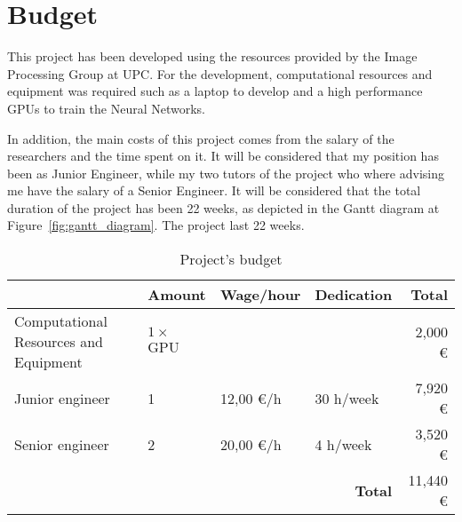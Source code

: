 \chapter{Budget}

This project has been developed using the resources provided by the Image Processing Group at UPC. For the development, computational resources and equipment was required such as a laptop to develop and a high performance GPUs to train the Neural Networks.

In addition, the main costs of this project comes from the salary of the researchers and the time spent on it. It will be considered that my position has been as Junior Engineer, while my two tutors of the project who where advising me have the salary of a Senior Engineer. It will be considered that the total duration of the project has been 22 weeks, as depicted in the Gantt diagram at Figure~\ref{fig:gantt_diagram}.
The project last 22 weeks.

\begin{table}[h]
\centering
\begin{tabular}{|l|l|l|l|r|} 
\hline
 & \textbf{Amount} & \textbf{Wage/hour} & \textbf{Dedication} & \textbf{Total}  \\ [0.5ex]
\hline
Computational Resources and Equipment & $1 \times$ GPU & \multicolumn{2}{|r|}{} & 2,000 \euro \\
\hline
Junior engineer & 1  & 12,00 \euro /h & 30 h/week & 7,920 \euro \\
\hline
Senior engineer & 2 & 20,00 \euro /h  & 4 h/week & 3,520 \euro \\
\hline
 \multicolumn{4}{|r|}{\textbf{Total}} & 11,440 \euro \\
\hline
\end{tabular}
\caption{Project's budget}
\end{table}